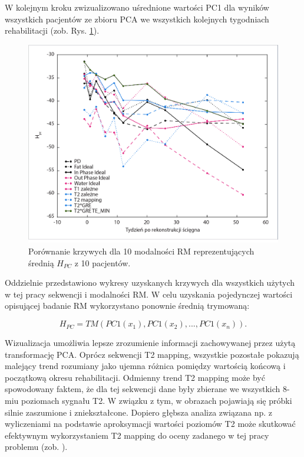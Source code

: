 W kolejnym kroku zwizualizowano uśrednione wartości PC1 dla wyników wszystkich pacjentów ze zbioru PCA we wszystkich kolejnych tygodniach rehabilitacji (zob. Rys. \ref{fig:H}).

\begin{figure}[h!]
	\centering
	\includegraphics[width=1\textwidth]{figures/H_PC1.jpg}
	\caption{Porównanie krzywych dla 10 modalności RM reprezentujących średnią $H_{PC}$ z 10 pacjentów.}\label{fig:H}
\end{figure}
Oddzielnie przedstawiono wykresy uzyskanych krzywych dla wszystkich użytych w tej pracy sekwencji i modalności RM. W celu uzyskania pojedynczej wartości opisującej badanie RM wykorzystano ponownie średnią trymowaną:

\begin{equation}
\label{ecq:HPC}
H_{PC} = TM(PC1(x_1), PC1(x_2),..., PC1(x_n)).
\end{equation}


\newpage
Wizualizacja umożliwia lepsze zrozumienie informacji zachowywanej przez użytą transformację PCA. Oprócz sekwencji T2 mapping, wszystkie pozostałe pokazują malejący trend rozumiany jako ujemna różnica pomiędzy wartością końcową i początkową okresu rehabilitacji. Odmienny trend T2 mapping może być spowodowany faktem, że dla tej sekwencji dane były zbierane we wszystkich 8-miu poziomach sygnału T2. W związku z tym, w obrazach pojawiają się próbki silnie zaszumione \linebreak i zniekształcone. Dopiero głębsza analiza związana np. z wyliczeniami na podstawie aproksymacji wartości poziomów T2 może skutkować efektywnym wykorzystaniem T2 mapping do oceny zadanego w tej pracy problemu (zob. \cite{Regulski2017}). 

